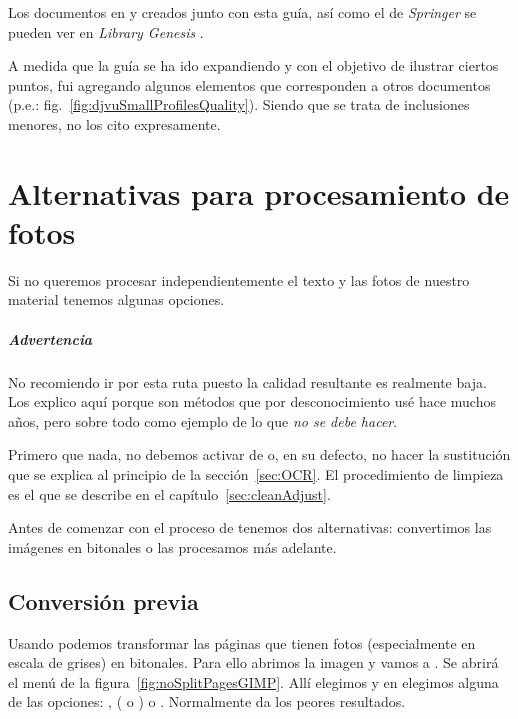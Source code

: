 \documentclass[%
	a5paper,
	10pt,
	twoside,
	openright,
	final,
]{memoir}
\begin{document}
{	Los documentos en \pdf \cite{miGregoryPDF} y \djvu \cite{miGregoryDjVu} creados junto con esta guía, así como el \pdf de \emph{Springer} \cite{SpringerGregoryPDF} se pueden ver en \emph{Library Genesis} \cite{LibGen}.

	A medida que la guía se ha ido expandiendo y con el objetivo de ilustrar ciertos puntos, fui agregando algunos elementos que corresponden a otros documentos (p.e.: fig.~\ref{fig:djvuSmallProfilesQuality}). Siendo que se trata de inclusiones menores, no los cito expresamente.

	\chapter{Alternativas para procesamiento de fotos\label{sec:noSplitPages}} Si no queremos procesar independientemente el texto y las fotos de nuestro material tenemos algunas opciones.

	\paragraph{Advertencia} No recomiendo ir por esta ruta puesto la calidad resultante es realmente baja. Los explico aquí porque son métodos que por desconocimiento usé hace muchos años, pero sobre todo como ejemplo de lo que \emph{no se debe hacer}.

	Primero que nada, no debemos activar  de \scantailor o, en su defecto, no hacer la sustitución que se explica al principio de la sección~\ref{sec:OCR}. El procedimiento de limpieza es el que se describe en el capítulo~\ref{sec:cleanAdjust}.

	Antes de comenzar con el proceso de \ocr tenemos dos alternativas: convertimos las imágenes en bitonales o las procesamos más adelante.

	\section{Conversión previa} Usando \gimp podemos transformar las páginas que tienen fotos (especialmente en escala de grises) en bitonales. Para ello abrimos la imagen y vamos a . Se abrirá el menú de la figura~\ref{fig:noSplitPagesGIMP}. Allí elegimos  y en  elegimos alguna de las opciones: ,  ( o ) o . Normalmente  da los peores resultados.

}
\end{document}
